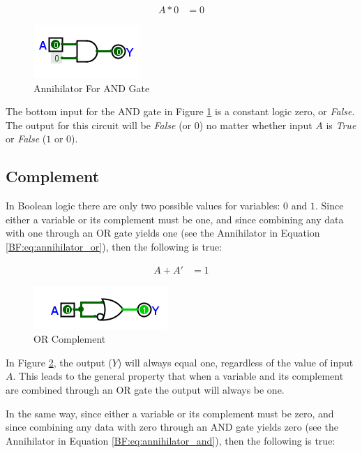 \begin{align}
  \label{BF:eq:annihilator_and}
  A * 0 &= 0 
\end{align}

\begin{figure}[H]
	\centering
	\includegraphics[width=\maxwidth{.95\linewidth}]{gfx/04_15}
	\caption{Annihilator For AND Gate}
	\label{fig:04_15}
\end{figure}

The bottom input for the \textsf{AND} gate in Figure \ref{fig:04_15} is a constant logic zero, or \emph{False}. The output for this circuit will be \emph{False} (or $ 0 $) no matter whether input $ A $ is \emph{True} or \emph{False} ($ 1 $ or $ 0 $).

\subsection{Complement}
\label{BF:subsec:complement}

In Boolean logic there are only two possible values for variables: $ 0 $ and $ 1 $. Since either a variable or its complement must be one, and since combining any data with one through an \textsf{OR} gate yields one (see the Annihilator in Equation \ref{BF:eq:annihilator_or}), then the following is true:

\begin{align}
  \label{BF:eq:complement_or}
  A + A' &= 1 
\end{align}

\begin{figure}[H]
	\centering
	\includegraphics[width=\maxwidth{.95\linewidth}]{gfx/04_16}
	\caption{OR Complement}
	\label{fig:04_16}
\end{figure}

In Figure \ref{fig:04_16}, the output ($ Y $) will always equal one, regardless of the value of input $ A $. This leads to the general property that when a variable and its complement are combined through an \textsf{OR} gate the output will always be one. 

In the same way, since either a variable or its complement must be zero, and since combining any data with zero through an \textsf{AND} gate yields zero (see the Annihilator in Equation \ref{BF:eq:annihilator_and}), then the following is true: 

